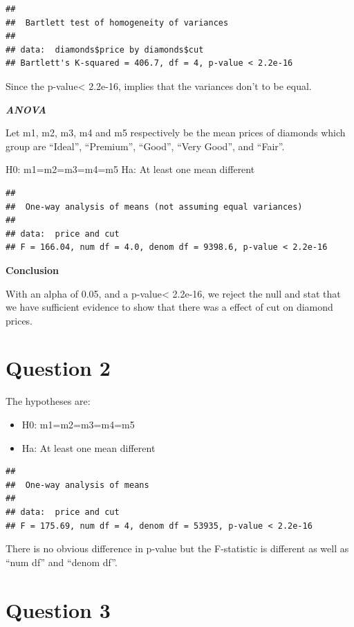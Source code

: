 \documentclass[
]{article}
\begin{document}
\begin{verbatim}
## 
##  Bartlett test of homogeneity of variances
## 
## data:  diamonds$price by diamonds$cut
## Bartlett's K-squared = 406.7, df = 4, p-value < 2.2e-16
\end{verbatim}

Since the p-value\textless{} 2.2e-16, implies that the variances don't
to be equal.

\textbf{\emph{ANOVA}}

Let m1, m2, m3, m4 and m5 respectively be the mean prices of diamonds
which group are ``Ideal'', ``Premium'', ``Good'', ``Very Good'', and
``Fair''.

H0: m1=m2=m3=m4=m5 Ha: At least one mean different

\begin{verbatim}
## 
##  One-way analysis of means (not assuming equal variances)
## 
## data:  price and cut
## F = 166.04, num df = 4.0, denom df = 9398.6, p-value < 2.2e-16
\end{verbatim}

\textbf{Conclusion}

With an alpha of 0.05, and a p-value\textless{} 2.2e-16, we reject the
null and stat that we have sufficient evidence to show that there was a
effect of cut on diamond prices.

\hypertarget{question-2}{%
\section{Question 2}\label{question-2}}

The hypotheses are:

\begin{itemize}
\item
  H0: m1=m2=m3=m4=m5
\item
  Ha: At least one mean different
\end{itemize}

\begin{verbatim}
## 
##  One-way analysis of means
## 
## data:  price and cut
## F = 175.69, num df = 4, denom df = 53935, p-value < 2.2e-16
\end{verbatim}

There is no obvious difference in p-value but the F-statistic is
different as well as ``num df'' and ``denom df''.

\hypertarget{question-3}{%
\section{Question 3}\label{question-3}}
\end{document}
